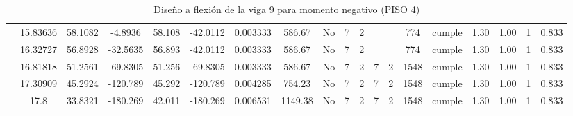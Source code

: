 \begin{table}[H]
{\begin{tabular}{|c|c|c|c|c|c|r|c|c|c|c|c|c|c|c|c|c|c|c|}
\cline{2-19}    & 15.83636 & 58.1082 & -4.8936 & 58.108 & -42.0112 & 0.003333 & 586.67 & No  & 7   & 2   &     &     & 774 & \cellcolor[rgb]{ .776,  .937,  .808}cumple & 1.30 & 1.00 & 1   & 0.833 \bigstrut\\
\cline{2-19}    & 16.32727 & 56.8928 & -32.5635 & 56.893 & -42.0112 & 0.003333 & 586.67 & No  & 7   & 2   &     &     & 774 & \cellcolor[rgb]{ .776,  .937,  .808}cumple & 1.30 & 1.00 & 1   & 0.833 \bigstrut\\
\cline{2-19}    & 16.81818 & 51.2561 & -69.8305 & 51.256 & -69.8305 & 0.003333 & 586.67 & No  & 7   & 2   & 7   & 2   & 1548 & \cellcolor[rgb]{ .776,  .937,  .808}cumple & 1.30 & 1.00 & 1   & 0.833 \bigstrut\\
\cline{2-19}    & 17.30909 & 45.2924 & -120.789 & 45.292 & -120.789 & 0.004285 & 754.23 & No  & 7   & 2   & 7   & 2   & 1548 & \cellcolor[rgb]{ .776,  .937,  .808}cumple & 1.30 & 1.00 & 1   & 0.833 \bigstrut\\
\cline{2-19}    & 17.8 & 33.8321 & -180.269 & 42.011 & -180.269 & 0.006531 & 1149.38 & No  & 7   & 2   & 7   & 2   & 1548 & \cellcolor[rgb]{ .776,  .937,  .808}cumple & 1.30 & 1.00 & 1   & 0.833 \bigstrut\\
\hline
\end{tabular}%

  
    
  }
      \caption{Diseño a flexión de la viga 9 para momento negativo (PISO 4) }
  \label{tab:F VG9 P4 M-}%
\end{table}%
